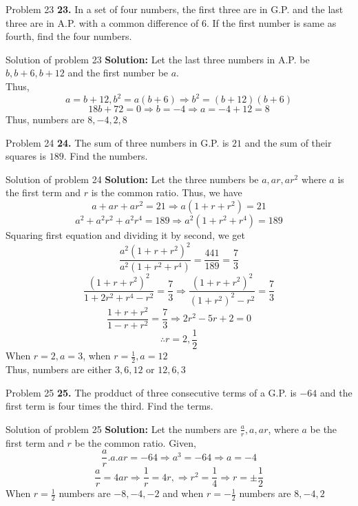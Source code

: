\documentclass[aspectratio=1610,8pt]{beamer}
\begin{document}
\begin{frame}{Problem 23}
  \textbf{23.} In a set of four numbers, the first three are in G.P. and the
  last three are in A.P. with a common difference of $6$. If the first number
  is same as fourth, find the four numbers.
\end{frame}
\begin{frame}{Solution of problem 23}
  \textbf{Solution:} Let the last three numbers in A.P. be $b, b+6, b+12$ and
  the first number be $a$.\\
  Thus, $$a = b + 12, b^2 = a(b + 6) \Rightarrow b^2 = (b + 12)(b + 6)$$
  $$18b + 72 = 0 \Rightarrow b = -4 \Rightarrow a = -4 + 12 = 8$$
  Thus, numbers are $8, -4, 2, 8$
\end{frame}
\begin{frame}{Problem 24}
  \textbf{24.} The sum of three numbers in G.P. is $21$ and the sum of their
  squares is $189$. Find the numbers.
\end{frame}
\begin{frame}{Solution of problem 24}
  \textbf{Solution:} Let the three numbers be $a, ar, ar^2$ where $a$ is the
  first term and $r$ is the common ratio. Thus, we have
  $$a + ar + ar^2 = 21 \Rightarrow a(1 + r + r^2) = 21$$
  $$a^2 + a^2r^2 + a^2r^4 = 189 \Rightarrow a^2(1 + r^2 + r^4) = 189$$
  Squaring first equation and dividing it by second, we get
  $$\frac{a^2(1 + r + r^2)^2}{a^2(1 + r^2 + r^4)} = \frac{441}{189} =
  \frac{7}{3}$$
  $$\frac{(1 + r + r^2)^2}{1 + 2r^2 + r^4 - r^2} = \frac{7}{3} \Rightarrow
  \frac{(1 + r + r^2)^2}{(1 + r^2)^2 - r^2} = \frac{7}{3}$$
  $$\frac{1 + r + r^2}{1 -r + r^2} = \frac{7}{3} \Rightarrow 2r^2 - 5r + 2 =
  0$$
  $$\therefore r = 2, \frac{1}{2}$$
  When $r = 2, a = 3$, when $r = \frac{1}{2}, a = 12$\\
  Thus, numbers are either $3, 6, 12$ or $12, 6, 3$
\end{frame}
\begin{frame}{Problem 25}
  \textbf{25.} The prodduct of three consecutive terms of a G.P. is $-64$ and
  the first term is four times the third. Find the terms.
\end{frame}
\begin{frame}{Solution of problem 25}
  \textbf{Solution:} Let the numbers are $\frac{a}{r}, a, ar$, where $a$ be the
  first term and $r$ be the common ratio. Given,
  $$\frac{a}{r}.a.ar = -64 \Rightarrow a^3 = -64 \Rightarrow a = -4$$
  $$\frac{a}{r} = 4ar \Rightarrow \frac{1}{r} = 4r, \Rightarrow r^2 =
  \frac{1}{4} \Rightarrow r = \pm \frac{1}{2}$$
  When $r = \frac{1}{2}$ numbers are $-8, -4, -2$ and when $r = -\frac{1}{2}$
  numbers are $8, -4, 2$
\end{frame}
\end{document}
